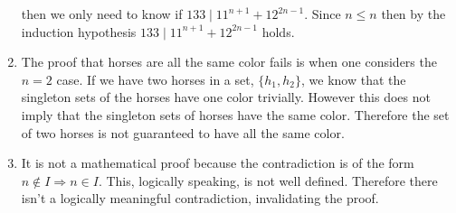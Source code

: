 \documentclass[12pt, letterpaper]{article}
\begin{document}
\begin{enumerate}
	
	then we only need to know if $133 \mid 11^{n+1} +  12^{2n-1}$.  
	Since $n \leq n$ then by the induction hypothesis $133 \mid 11^{n+1} +  12^{2n-1}$ holds.  
	
	\item The proof that horses are all the same color fails is when one considers the $n=2$ case.  If we have two horses in a set, $\{h_1, h_2\}$, we know that the singleton sets of the horses have one color trivially.  However this does not imply that the singleton sets of horses have the same color.  Therefore the set of two horses is not guaranteed to have all the same color.   
	\item It is not a mathematical proof because the contradiction is of the form $n \not \in I \Rightarrow n \in I$.  This, logically speaking, is not well defined.  Therefore there isn't a logically meaningful contradiction, invalidating the proof.  
\end{enumerate}
\end{document}
